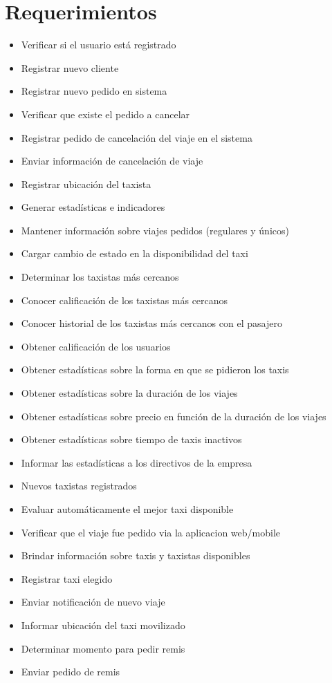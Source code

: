 \documentclass[a4paper]{article}
\begin{document}
\section{Requerimientos}


\begin{itemize}
\item Verificar si el usuario est\'a registrado
\item Registrar nuevo cliente
\item Registrar nuevo pedido en sistema
\item Verificar que existe el pedido a cancelar
\item Registrar pedido de cancelaci\'on del viaje en el sistema
\item Enviar informaci\'on de cancelaci\'on de viaje
\item Registrar ubicaci\'on del taxista
\item Generar estad\'isticas e indicadores
\item Mantener informaci\'on sobre viajes pedidos (regulares  y \'unicos)
\item Cargar cambio de estado en la disponibilidad del taxi
\item Determinar los taxistas m\'as cercanos
\item Conocer calificaci\'on de los taxistas m\'as cercanos
\item Conocer historial de los taxistas m\'as cercanos con el pasajero
\item Obtener calificaci\'on de los usuarios
\item Obtener estad\'isticas sobre la forma en que se pidieron los taxis
\item Obtener estad\'isticas sobre la duraci\'on de los viajes
\item Obtener estad\'isticas sobre precio en funci\'on de la duraci\'on de los viajes
\item Obtener estad\'isticas sobre tiempo de taxis inactivos
\item Informar las estad\'isticas a los directivos de la empresa
\item Nuevos taxistas registrados
\item Evaluar autom\'aticamente el mejor taxi disponible
\item Verificar que el viaje fue pedido via la aplicacion web/mobile
\item Brindar informaci\'on sobre taxis y taxistas disponibles
\item Registrar taxi elegido
\item Enviar notificaci\'on de nuevo viaje
\item Informar ubicaci\'on del taxi movilizado
\item Determinar momento para pedir remis
\item Enviar pedido de remis

\end{itemize}
\end{document}
